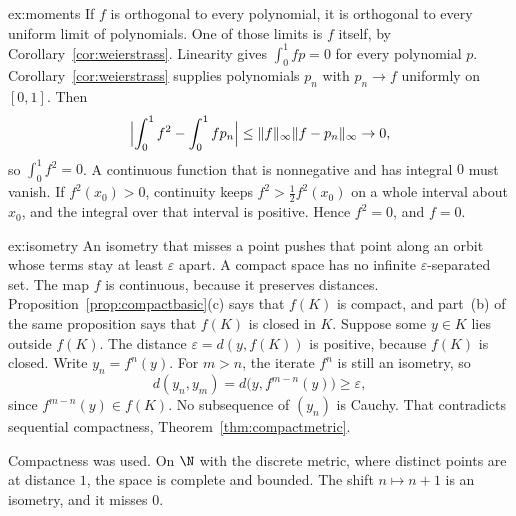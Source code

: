 \begin{solution}{ex:moments}
\idea If $f$ is orthogonal to every polynomial, it is orthogonal to every uniform limit of polynomials. One of those limits is $f$ itself, by Corollary~\ref{cor:weierstrass}.
\writeup Linearity gives $\int_0^1 fp=0$ for every polynomial $p$. Corollary~\ref{cor:weierstrass} supplies polynomials $p_n$ with $p_n\to f$ uniformly on $[0,1]$. Then
\[\Bigl|\int_0^1f^2-\int_0^1fp_n\Bigr|\le\|f\|_\infty\|f-p_n\|_\infty\to0,\]
so $\int_0^1 f^2=0$. A continuous function that is nonnegative and has integral $0$ must vanish. If $f^2(x_0)>0$, continuity keeps $f^2>\frac12 f^2(x_0)$ on a whole interval about $x_0$, and the integral over that interval is positive. Hence $f^2=0$, and $f=0$.
\end{solution}

\begin{solution}{ex:isometry}
\idea An isometry that misses a point pushes that point along an orbit whose terms stay at least $\varepsilon$ apart. A compact space has no infinite $\varepsilon$-separated set.
\writeup The map $f$ is continuous, because it preserves distances. Proposition~\ref{prop:compactbasic}(c) says that $f(K)$ is compact, and part~(b) of the same proposition says that $f(K)$ is closed in $K$. Suppose some $y\in K$ lies outside $f(K)$. The distance $\varepsilon=d(y,f(K))$ is positive, because $f(K)$ is closed. Write $y_n=f^n(y)$. For $m>n$, the iterate $f^n$ is still an isometry, so
\[d(y_n,y_m)=d\bigl(y,f^{m-n}(y)\bigr)\ge\varepsilon,\]
since $f^{m-n}(y)\in f(K)$. No subsequence of $(y_n)$ is Cauchy. That contradicts sequential compactness, Theorem~\ref{thm:compactmetric}.

Compactness was used. On $\N$ with the discrete metric, where distinct points are at distance $1$, the space is complete and bounded. The shift $n\mapsto n+1$ is an isometry, and it misses $0$.
\end{solution}

